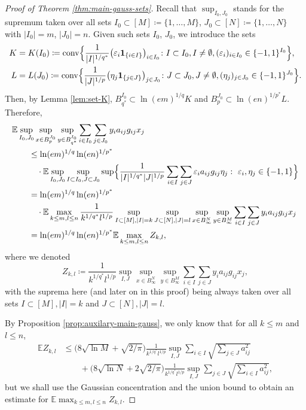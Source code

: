 \documentclass[a4paper]{amsart}
\theoremstyle{definition}
\theoremstyle{remark}
\numberwithin{equation}{section}
\newcommand*{\EE}{\mathbb{E}}
\newcommand*{\conv}{\operatorname{conv}} %
\newcommand*{\ind}{\mathbf{1}} %
\begin{document}
\begin{proof}[Proof of Theorem \ref{thm:main-gauss-sets}]
Recall that $\sup_{I_0,J_0}$ stands for the supremum taken over all sets $I_0\subset [M] \coloneqq \{1,\ldots , M \} $, $J_0\subset [N] \coloneqq \{1,\ldots , N \}$ with $|I_0|=m$, $|J_0|=n$.
Given such sets $I_0$, $ {J_0}$,
we introduce the sets
	\begin{align*}
		K& = K(I_0)  \coloneqq \conv \Bigl\{ \frac{1}{|I|^{1/q^*}}\bigl( \varepsilon_i \ind_{\{i\in I\}} \bigr)_{i\in I_0} \colon I\subset I_0, I\neq \emptyset, (\varepsilon_i )_{i\in  I_0}\in \{-1,1\}^{I_0} \Bigr\},\\
	L&= L(J_0)\coloneqq \conv \Bigl\{ \frac{1}{|J|^{1/p}}\bigl( \eta_j \ind_{\{j\in J\}} \bigr)_{j\in {J_0}} \colon J\subset {J_0}, J\neq \emptyset, (\eta_j )_{j\in  {J_0}}\in \{-1,1\}^ {J_0}\Bigr\}.
	\end{align*}
Then, by Lemma \ref{lem:set-K}, $B_{q^*}^{I_0} \subset \ln(em)^{1/q} K$ and $B_{p}^{J_0}\subset \ln(en)^{1/p^*} L$.
 Therefore,
	\begin{align}
	 \label{eq:proof-aux-prop-1}
	 \nonumber
	 \MoveEqLeft
\EE \sup_{I_0, J_0} \sup_{x\in B_p^ {J_0}} \sup_{y\in B_{q^*}^ {I_0}} \sum_{i\in I_0} \sum_{j\in J_0} y_i a_{ij} g_{ij} x_j
	  \\
	   \nonumber
&\leq 	\ln(em)^{1/q} \ln(en)^{1/p^*} \\
\nonumber &\quad\cdot
	 \EE \sup_{I_0, J_0} \sup_{I\subset I_0,  J\subset J_0} \sup  \Bigl\{ \frac 1{|I|^{1/q^*}|J|^{1/p}}  \sum_{i\in I}\sum_{j\in J}  \varepsilon_ia_{ij} g_{ij}\eta_j :
	 \
	 \varepsilon_i, \eta_j \in \{-1,1 \} \Bigr\}
	\\
	 \nonumber &   = \ln(em)^{1/q} \ln(en)^{1/p^*}
	 \\
	 \nonumber &\quad\cdot
	   \EE \max_{k\leq m, l\leq n}  \frac 1{k^{1/q^*} l^{1/p}} \sup_{I\subset [M], |I|=k} \sup_{J\subset [N], |J|=l} \sup_{x\in B_\infty^N} \sup_{y\in B_\infty^M} \sum_{i\in I}\sum_{j\in J}y_ia_{ij}g_{ij}x_j
	 \\
	 & 	 =   \ln(em)^{1/q} \ln(en)^{1/p^*} \EE \max_{k\leq m, l\leq n} Z_{k,l},
	\end{align}
	where we denoted
	\[
		Z_{k,l}\coloneqq \frac 1{k^{1/q^*}l^{1/p}} \sup_{I,J} \sup_{x\in B_\infty^N} \sup_{y\in B_\infty^M} \sum_{i\in I}\sum_{j\in J} y_ia_{ij} g_{ij}x_j ,
	\]
	with the suprema here (and later on in this proof) being always taken over all sets $I\subset [M], |I|=k$ and $J\subset [N], |J|=l$.
	
	By Proposition \ref{prop:auxilary-main-gauss}, we only know that for all $k\leq m$ and $l\leq n$,
	\begin{align}  \label{eq:proof-aux-prop-2}
	\EE Z_{k,l} & \leq
\bigl(8\sqrt{\ln M}   + \sqrt{2/\pi}\bigr)  \frac 1{k^{1/q^*}l^{1/p}}	\sup_{I, J}  \sum_{i\in I}  \sqrt{\sum_{j\in J} a_{ij}^2} \nonumber\\
 &   \qquad + \bigl(8\sqrt{\ln N} +2 \sqrt{2/\pi}\bigr)  \frac 1{k^{1/q^*}l^{1/p}}  \sup_{I, J} \sum_{j\in J} \sqrt{\sum_{i\in I} a_{ij}^2 },
	\end{align}
	but we shall use the Gaussian concentration and the union bound to obtain an estimate for $\EE \max_{k\leq m, l\leq n} Z_{k,l}.$
	

\end{proof}
\end{document}
